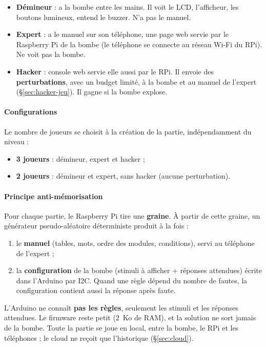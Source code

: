 \documentclass[11pt,a4paper]{article}
\begin{document}
\begin{itemize}
  \item \textbf{Démineur} : a la bombe entre les mains. Il voit le LCD, l'afficheur, les boutons lumineux, entend le buzzer. N'a pas le manuel.
  \item \textbf{Expert} : a le manuel sur son téléphone, une page web servie par le Raspberry Pi de la bombe (le téléphone se connecte au réseau Wi-Fi du RPi). Ne voit pas la bombe.
  \item \textbf{Hacker} : console web servie elle aussi par le RPi. Il envoie des \textbf{perturbations}, avec un budget limité, à la bombe et au manuel de l'expert (\S\ref{sec:hacker-jeu}). Il gagne si la bombe explose.
\end{itemize}

\paragraph{Configurations} Le nombre de joueurs se choisit à la création de la partie, indépendamment du niveau :

\begin{itemize}
  \item \textbf{3 joueurs} : démineur, expert et hacker ;
  \item \textbf{2 joueurs} : démineur et expert, sans hacker (aucune perturbation).
\end{itemize}

\paragraph{Principe anti-mémorisation} Pour chaque partie, le Raspberry Pi tire une \textbf{graine}. À partir de cette graine, un générateur pseudo-aléatoire déterministe produit à la fois :

\begin{enumerate}
  \item le \textbf{manuel} (tables, mots, ordre des modules, conditions), servi au téléphone de l'expert ;
  \item la \textbf{configuration} de la bombe (stimuli à afficher + réponses attendues) écrite dans l'Arduino par I2C. Quand une règle dépend du nombre de fautes, la configuration contient aussi la réponse \og après faute\fg{}.
\end{enumerate}

L'Arduino ne connaît \textbf{pas les règles}, seulement les stimuli et les réponses attendues. Le firmware reste petit (2~Ko de RAM), et la solution ne sort jamais de la bombe. Toute la partie se joue en local, entre la bombe, le RPi et les téléphones ; le cloud ne reçoit que l'historique (\S\ref{sec:cloud}).
\end{document}

